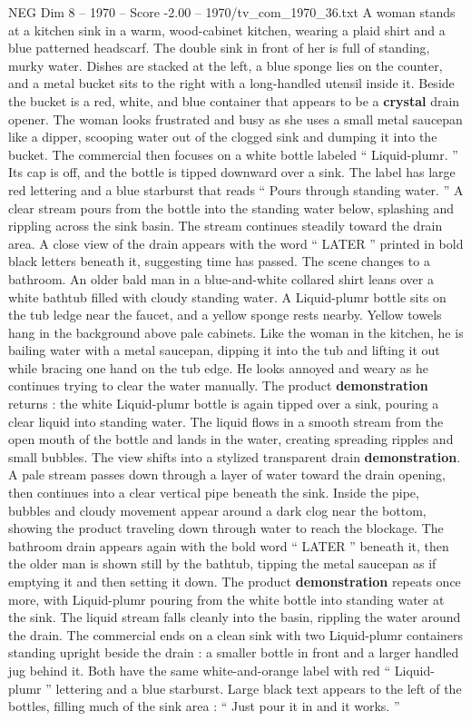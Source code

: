 \begin{textsample}{NEG Dim 8 – 1970 – Score -2.00 – 1970/tv\_com\_1970\_36.txt}  \label{ex:f8_neg_064}
A woman stands at a kitchen sink in a warm, wood-cabinet kitchen, wearing a plaid shirt and a blue patterned headscarf.
The double sink in front of her is full of standing, murky water.
Dishes are stacked at the left, a blue sponge lies on the counter, and a metal bucket sits to the right with a long-handled utensil inside it.
Beside the bucket is a red, white, and blue container that appears to be a \textbf{crystal} drain opener.
The woman looks frustrated and busy as she uses a small metal saucepan like a dipper, scooping water out of the clogged sink and dumping it into the bucket.
The commercial then focuses on a white bottle labeled “ Liquid-plumr. ” Its cap is off, and the bottle is tipped downward over a sink.
The label has large red lettering and a blue starburst that reads “ Pours through standing water. ” A clear stream pours from the bottle into the standing water below, splashing and rippling across the sink basin.
The stream continues steadily toward the drain area.
A close view of the drain appears with the word “ LATER ” printed in bold black letters beneath it, suggesting time has passed.
The scene changes to a bathroom.
An older bald man in a blue-and-white collared shirt leans over a white bathtub filled with cloudy standing water.
A Liquid-plumr bottle sits on the tub ledge near the faucet, and a yellow sponge rests nearby.
Yellow towels hang in the background above pale cabinets.
Like the woman in the kitchen, he is bailing water with a metal saucepan, dipping it into the tub and lifting it out while bracing one hand on the tub edge.
He looks annoyed and weary as he continues trying to clear the water manually.
The product \textbf{demonstration} returns : the white Liquid-plumr bottle is again tipped over a sink, pouring a clear liquid into standing water.
The liquid flows in a smooth stream from the open mouth of the bottle and lands in the water, creating spreading ripples and small bubbles.
The view shifts into a stylized transparent drain \textbf{demonstration}.
A pale stream passes down through a layer of water toward the drain opening, then continues into a clear vertical pipe beneath the sink.
Inside the pipe, bubbles and cloudy movement appear around a dark clog near the bottom, showing the product traveling down through water to reach the blockage.
The bathroom drain appears again with the bold word “ LATER ” beneath it, then the older man is shown still by the bathtub, tipping the metal saucepan as if emptying it and then setting it down.
The product \textbf{demonstration} repeats once more, with Liquid-plumr pouring from the white bottle into standing water at the sink.
The liquid stream falls cleanly into the basin, rippling the water around the drain.
The commercial ends on a clean sink with two Liquid-plumr containers standing upright beside the drain : a smaller bottle in front and a larger handled jug behind it.
Both have the same white-and-orange label with red “ Liquid-plumr ” lettering and a blue starburst.
Large black text appears to the left of the bottles, filling much of the sink area : “ Just pour it in and it works. ”

\end{textsample}
